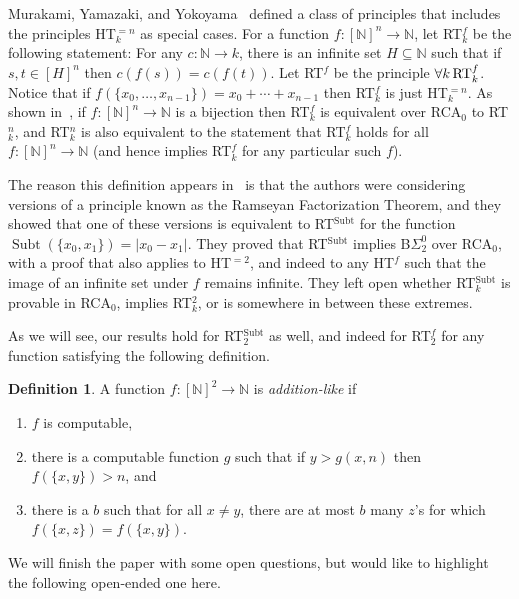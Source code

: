 \documentclass{amsart}
\theoremstyle{definition}
\newtheorem{defn}[thm]{Definition}
\DeclareMathOperator{\subt}{Subt}
\begin{document}
Murakami, Yamazaki, and Yokoyama~\cite{MYY} defined a class of
principles that includes the principles HT$^{=n}_k$ as special cases.
For a function $f: [\mathbb N]^n \rightarrow \mathbb N$, let RT$^f_k$
be the following statement: For any $c : \mathbb N \rightarrow k$,
there is an infinite set $H \subseteq \mathbb N$ such that if $s,t \in
[H]^n$ then $c(f(s))=c(f(t))$. Let RT$^f$ be the principle $\forall
k\, \textup{RT}^f_k$. Notice that if $f(\{x_0,\ldots,x_{n-1}\})=x_0 +
\cdots + x_{n-1}$ then RT$^f_k$ is just HT$^{=n}_k$. As shown
in~\cite{MYY}, if $f: [\mathbb N]^n \rightarrow \mathbb N$ is a
bijection then RT$^f_k$ is equivalent over RCA$_0$ to RT$^n_k$, and
RT$^n_k$ is also equivalent to the statement that RT$^f_k$ holds for
all $f: [\mathbb N]^n \rightarrow \mathbb N$ (and hence implies
RT$^f_k$ for any particular such $f$).

The reason this definition appears in~\cite{MYY} is that the authors
were considering versions of a principle known as the Ramseyan
Factorization Theorem, and they showed that one of these versions is
equivalent to RT$^{\subt}$ for the function
$\subt(\{x_0,x_1\})=|x_0-x_1|$. They proved that RT$^{\subt}$ implies
B$\Sigma^0_2$ over RCA$_0$, with a proof that also applies to HT$^{=2}$,
and indeed to any HT$^f$ such that the image of an infinite set under
$f$ remains infinite. They left open whether RT$^{\subt}_k$ is
provable in RCA$_0$, implies RT$^2_k$, or is somewhere in between
these extremes.

As we will see, our results hold for RT$^{\subt}_2$ as well, and
indeed for RT$^f_2$ for any function satisfying the following
definition.

\begin{defn}
\label{aldef}
A function $f : [\mathbb N]^2 \rightarrow \mathbb N$ is
\emph{addition-like} if
\begin{enumerate}

\item $f$ is computable,

\item there is a computable function $g$ such that if $y>g(x,n)$ then
$f(\{x,y\})>n$, and

\item there is a $b$ such that for all $x \neq y$, there are at most
$b$ many $z$'s for which $f(\{x,z\})=f(\{x,y\})$.

\end{enumerate}
\end{defn}

We will finish the paper with some open questions, but would like to
highlight the following open-ended one here.
\end{document}
